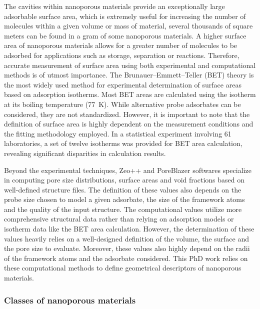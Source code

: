 \documentclass[main.tex]{subfiles}
\begin{document}
The cavities within nanoporous materials provide an exceptionally large adsorbable surface area, which is extremely useful for increasing the number of molecules within a given volume or mass of material, several thousands of square meters can be found in a gram of some nanoporous materials.\autocite{Farha_2012} A higher surface area of nanoporous materials allows for a greater number of molecules to be adsorbed for applications such as storage, separation or reactions. Therefore, accurate measurement of surface area using both experimental and computational methods is of utmost importance. The Brunauer–Emmett–Teller (BET) theory is the most widely used method for experimental determination of surface areas based on adsorption isotherms.\autocite{Detsi_2011} Most BET areas are calculated using the  isotherm at its boiling temperature (\SI{77}{\kelvin}). While alternative probe adsorbates can be considered, they are not standardized.\autocite{Tian_2017} However, it is important to note that the definition of surface area is highly dependent on the measurement conditions and the fitting methodology employed. In a statistical experiment involving 61 laboratories, a set of twelve isotherms was provided for BET area calculation, revealing significant disparities in calculation results.\autocite{Osterrieth_2022} 

Beyond the experimental techniques, Zeo++ and PoreBlazer softwares specialize in computing pore size distributions, surface areas and void fractions based on well-defined structure files.\autocite{Zeo++,PoreBlazer} The definition of these values also depends on the probe size chosen to model a given adsorbate, the size of the framework atoms and the quality of the input structure. The computational values utilize more comprehensive structural data rather than relying on adsorption models or isotherm data like the BET area calculation. However, the determination of these values heavily relies on a well-designed definition of the volume, the surface and the pore size to evaluate. Moreover, these values also highly depend on the radii of the framework atoms and the adsorbate considered.\autocite{Hung_2021} This PhD work relies on these computational methods to define geometrical descriptors of nanoporous materials.

\subsubsection{Classes of nanoporous materials}
\end{document}
